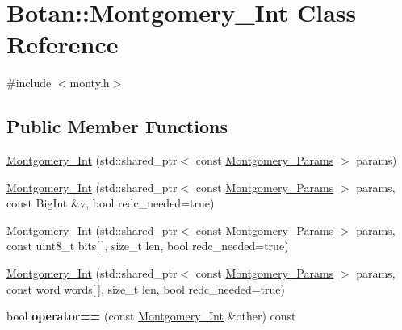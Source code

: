 \hypertarget{class_botan_1_1_montgomery___int}{}\section{Botan\+:\+:Montgomery\+\_\+\+Int Class Reference}
\label{class_botan_1_1_montgomery___int}


{\ttfamily \#include $<$monty.\+h$>$}

\subsection*{Public Member Functions}
\begin{DoxyCompactItemize}
\item 
\hyperlink{class_botan_1_1_montgomery___int_a129cc27370aacbb8cc3f56c75239efce}{Montgomery\+\_\+\+Int} (std\+::shared\+\_\+ptr$<$ const \hyperlink{class_botan_1_1_montgomery___params}{Montgomery\+\_\+\+Params} $>$ params)
\item 
\hyperlink{class_botan_1_1_montgomery___int_acc0e9d1c3a33343a1f70f1850a12160f}{Montgomery\+\_\+\+Int} (std\+::shared\+\_\+ptr$<$ const \hyperlink{class_botan_1_1_montgomery___params}{Montgomery\+\_\+\+Params} $>$ params, const Big\+Int \&v, bool redc\+\_\+needed=true)
\item 
\hyperlink{class_botan_1_1_montgomery___int_a40f15c2012a27cc98c720de74200117d}{Montgomery\+\_\+\+Int} (std\+::shared\+\_\+ptr$<$ const \hyperlink{class_botan_1_1_montgomery___params}{Montgomery\+\_\+\+Params} $>$ params, const uint8\+\_\+t bits\mbox{[}$\,$\mbox{]}, size\+\_\+t len, bool redc\+\_\+needed=true)
\item 
\hyperlink{class_botan_1_1_montgomery___int_a5b3ce373167c2c897ffa6264327eec61}{Montgomery\+\_\+\+Int} (std\+::shared\+\_\+ptr$<$ const \hyperlink{class_botan_1_1_montgomery___params}{Montgomery\+\_\+\+Params} $>$ params, const word words\mbox{[}$\,$\mbox{]}, size\+\_\+t len, bool redc\+\_\+needed=true)
\item 
\mbox{\label{class_botan_1_1_montgomery___int_a1a8d9c17a5a4a1155423f204fe9a39c2}} 
bool {\bfseries operator==} (const \hyperlink{class_botan_1_1_montgomery___int}{Montgomery\+\_\+\+Int} \&other) const
\item 
\mbox{\label{class_botan_1_1_montgomery___int_ab3274a085a383b8392c94b474d1a1b6b}} 

\end{DoxyCompactItemize}
